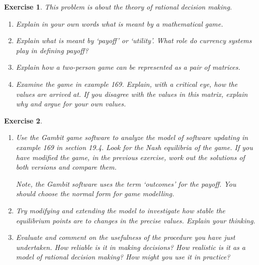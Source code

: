 \documentclass{book}
\newtheorem{exercise}{Exercise}
\begin{document}
\begin{exercise}
This problem is about the theory of rational decision making.
\begin{enumerate}

\item Explain in your own words what is meant by a mathematical game.

\item Explain what is meant by `payoff' or `utility'. What role do currency systems
play in defining payoff?

\item Explain how a two-person game can be represented as a {\em pair} of matrices.

\item Examine the game in example 169. Explain, with a critical eye, 
how the values are arrived at. If you disagree with the values in this matrix,
explain why and argue for your own values.
\end{enumerate}
\end{exercise}
\begin{solution}
\end{solution}


\begin{exercise}
\begin{enumerate}

\item Use the Gambit game software to analyze the model of software
updating in example 169 in section 19.4. Look for the Nash equilibria
of the game. If you have modified the game, in the previous exercise,
work out the solutions of both versions and compare them.

Note, the Gambit software uses the term `outcomes' for the payoff. You
should choose the normal form for game modelling.

\item Try modifying and extending the model to investigate how stable the
equilibrium points are to changes in the precise values. Explain your
thinking.

\item Evaluate and comment on the usefulness of the procedure you have
just undertaken. How reliable is it in making decisions? How realistic is it
as a model of rational decision making? How might you use it in practice?
\end{enumerate}
\end{exercise}
\begin{solution}
\end{solution}
\end{document}
